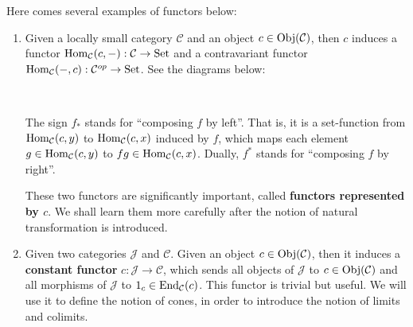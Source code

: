 	\begin{example}
	Here comes several examples of functors below:
	\begin{enumerate}[label=(\roman*)]
	\item Given a locally small category $\mathcal{C}$ and an object $c\in \operatorname{Obj}(\mathcal{C})$, then $c$ induces a functor $\operatorname{Hom}_{\mathcal{C}}(c,-):\mathcal{C}\to \mathrm{Set}$ and a contravariant functor $\operatorname{Hom}_{\mathcal{C}}(-,c):\mathcal{C}^{op}\to \mathrm{Set}$. See the diagrams below:
	
	\begin{center}
	\ \ \ \ \ \ \ \ \ 
	\end{center}
	The sign $f_*$ stands for ``composing $f$ by left''. That is, it is a set-function from $\operatorname{Hom}_\mathcal{C}(c,y)$ to $\operatorname{Hom}_\mathcal{C}(c,x)$ induced by $f$, which maps each element $g\in \operatorname{Hom}_\mathcal{C}(c,y)$ to $fg\in \operatorname{Hom}_\mathcal{C}(c,x)$. Dually, $f^*$ stands for ``composing $f$ by right''.\par
	These two functors are significantly important, called \textbf{functors represented by $c$}. We shall learn them more carefully after the notion of natural transformation is introduced.
	\item Given two categories $\mathcal{J}$ and $\mathcal{C}$. Given an object $c\in \operatorname{Obj}(\mathcal{C})$, then it induces a \textbf{constant functor} $c:\mathcal{J}\to \mathcal{C}$, which sends all objects of $\mathcal{J}$ to $c\in\operatorname{Obj}(\mathcal{C})$ and all morphisms of $\mathcal{J}$ to $1_c\in\operatorname{End}_\mathcal{C}(c)$. This functor is trivial but useful. We will use it to define the notion of cones, in order to introduce the notion of limits and colimits.

\end{enumerate}
\end{example}
